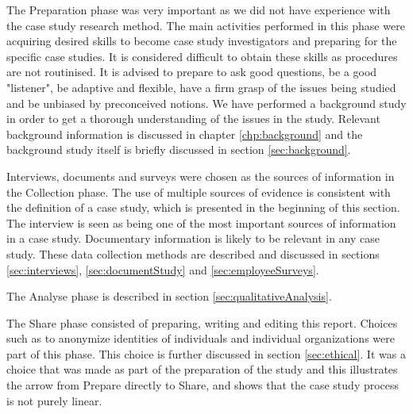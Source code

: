 The Preparation phase was very important as we did not have experience with the case study research method. The main activities performed in this phase were acquiring desired skills to become case study investigators and preparing for the specific case studies. It is considered difficult to obtain these skills as procedures are not routinised. It is advised to prepare to ask good questions, be a good "listener", be adaptive and flexible, have a firm grasp of the issues being studied and be unbiased by preconceived notions. We have performed a background study in order to get a thorough understanding of the issues in the study. Relevant background information is discussed in chapter \ref{chp:background} and the background study itself is briefly discussed in section \ref{sec:background}. %

Interviews, documents and surveys were chosen as the sources of information in the Collection phase. The use of multiple sources of evidence is consistent with the definition of a case study, which is presented in the beginning of this section. The interview is seen as being one of the most important sources of information in a case study. Documentary information is likely to be relevant in any case study. These data collection methods are described and discussed in sections \ref{sec:interviews}, \ref{sec:documentStudy} and \ref{sec:employeeSurveys}.

The Analyse phase is described in section \ref{sec:qualitativeAnalysis}.

The Share phase consisted of preparing, writing and editing this report. Choices such as to anonymize identities of individuals and individual organizations were part of this phase. This choice is further discussed in section \ref{sec:ethical}. It was a choice that was made as part of the preparation of the study and this illustrates the arrow from Prepare directly to Share, and shows that the case study process is not purely linear. 